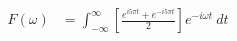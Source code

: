 \documentclass[preview]{standalone}
\begin{document}
\begin{align*}
F(\omega)&=\int_{-\infty}^{\infty}\left[ \frac{e^{i5\pi t}+e^{-i5\pi t}}{2}\right] e^{-i\omega t} \ dt \\
\end{align*}
\end{document}
